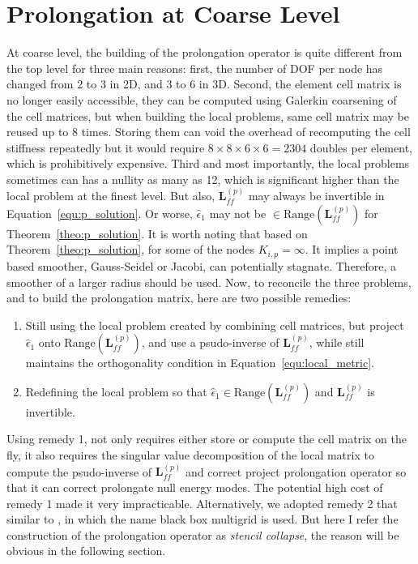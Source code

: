 \section{Prolongation at Coarse Level}
\label{sec:Prolongation_Coarse}
At coarse level, the building of the prolongation operator is quite different from the top level for three main reasons: first, the number of DOF per node has changed from $2$ to $3$ in 2D, and $3$ to $6$ in 3D. Second, the element cell matrix is no longer easily accessible, they can be computed using Galerkin coarsening of the cell matrices, but when building the local problems, same cell matrix may be reused up to 8 times. Storing them can void the overhead of recomputing the cell stiffness repeatedly but it would require $8 \times 8 \times 6 \times 6 = 2304$ doubles per element, which is prohibitively expensive. Third and most importantly, the local problems sometimes can has a nullity as many as 12, which is significant higher than the local problem at the finest level. But also, $\mathbf{L}^{(p)}_{ff}$ may always be invertible in Equation~\ref{equ:p_solution}. Or worse, $\hat{\epsilon}_1$ may not be $\in \text{Range}(\mathbf{L}^{(p)}_{ff})$ for Theorem~\ref{theo:p_solution}. It is worth noting that based on Theorem~\ref{theo:p_solution}, for some of the nodes $K_{i,p} = \infty$. It implies a point based smoother, Gauss-Seidel or Jacobi, can potentially stagnate. Therefore, a smoother of a larger radius should be used. Now, to reconcile the three problems, and to build the prolongation matrix, here are two possible remedies:
\begin{enumerate}
\item Still using the local problem created by combining cell matrices, but project $\hat{\epsilon}_1$ onto $\text{Range}(\mathbf{L}^{(p)}_{ff})$, and use a psudo-inverse of $\mathbf{L}^{(p)}_{ff}$, while still maintains the orthogonality condition in Equation~\ref{equ:local_metric}.
\item Redefining the local problem so that $\hat{\epsilon}_1 \in \text{Range}(\mathbf{L}^{(p)}_{ff})$ and $\mathbf{L}^{(p)}_{ff}$ is invertible.
\end{enumerate}
Using remedy 1, not only requires either store or compute the cell matrix on the fly, it also requires the singular value decomposition of the local matrix to compute the psudo-inverse of $\mathbf{L}^{(p)}_{ff}$ and correct project prolongation operator so that it can correct prolongate null energy modes. The potential high cost of remedy 1 made it very impracticable. Alternatively, we adopted remedy 2 that similar to \cite{dendy1982black}, in which the name black box multigrid is used. But here I refer the construction of the prolongation operator as \textit{stencil collapse}, the reason will be obvious in the following section.
